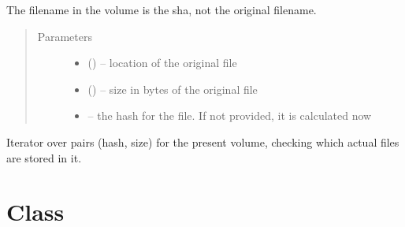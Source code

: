 \documentclass[letterpaper,10pt,english]{sphinxmanual}
\begin{document}
\begin{fulllineitems}
\begin{fulllineitems}
The filename in the volume is the sha, not the original filename.
\begin{quote}\begin{description}
\item[{Parameters}] \leavevmode\begin{itemize}
\item {} 
 () -- location of the original file

\item {} 
 () -- size in bytes of the original file

\item {} 
 -- the hash for the file. If not provided, it is calculated now

\end{itemize}

\end{description}\end{quote}

\end{fulllineitems}


\begin{fulllineitems}
\label{\detokenize{index:fsbackup.hashVolume.HashVolume.traverseFiles}}
Iterator over pairs (hash, size) for the present volume, checking which actual files are stored in it.

\end{fulllineitems}


\end{fulllineitems}



\section{Class }
\label{\detokenize{index:module-fsbackup.fileDB}}\label{\detokenize{index:class-filedb}}\label{\detokenize{index:module-fileDB}}
\end{document}

